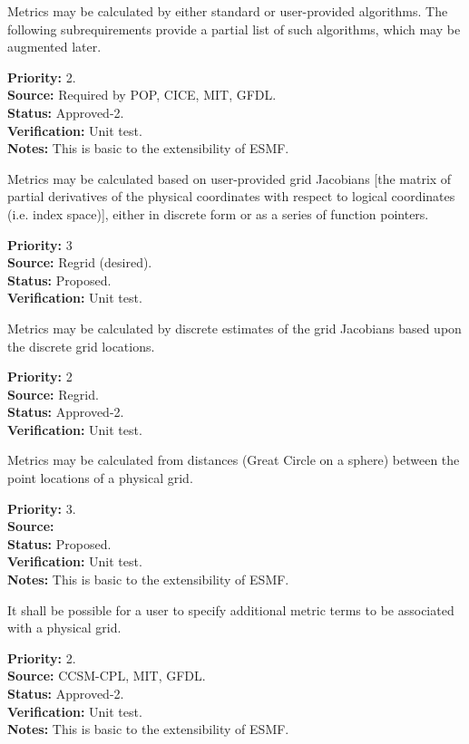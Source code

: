 Metrics may be calculated by either standard or user-provided algorithms.
The following subrequirements provide a partial list of such algorithms,
which may be augmented later.
\begin{reqlist}
{\bf Priority:} 2. \\
{\bf Source:} Required by POP, CICE, MIT, GFDL. \\
{\bf Status:} Approved-2. \\
{\bf Verification:} Unit test. \\
{\bf Notes:} This is basic to the extensibility of ESMF. 
\end{reqlist}

Metrics may be calculated based on user-provided grid Jacobians [the matrix of
partial derivatives of the physical coordinates with respect to logical
coordinates (i.e. index space)], either in discrete form or as a series of function pointers.
\begin{reqlist}
{\bf Priority:} 3 \\
{\bf Source:} Regrid (desired). \\
{\bf Status:} Proposed. \\
{\bf Verification:} Unit test. 
\end{reqlist}

Metrics may be calculated by discrete estimates of the grid Jacobians based upon
the discrete grid locations.
\begin{reqlist}
{\bf Priority:} 2 \\
{\bf Source:} Regrid. \\
{\bf Status:} Approved-2. \\
{\bf Verification:} Unit test.
\end{reqlist}

Metrics may be calculated from distances (Great Circle on a sphere) between
the point locations of a physical grid.
\begin{reqlist}
{\bf Priority:} 3. \\
{\bf Source:} \\
{\bf Status:} Proposed. \\
{\bf Verification:} Unit test. \\
{\bf Notes:} This is basic to the extensibility of ESMF. 
\end{reqlist}

It shall be possible for a user to specify additional metric terms to be associated
with a physical grid.
\begin{reqlist}
{\bf Priority:} 2. \\
{\bf Source:} CCSM-CPL, MIT, GFDL. \\
{\bf Status:} Approved-2. \\
{\bf Verification:} Unit test. \\
{\bf Notes:} This is basic to the extensibility of ESMF. 
\end{reqlist}



